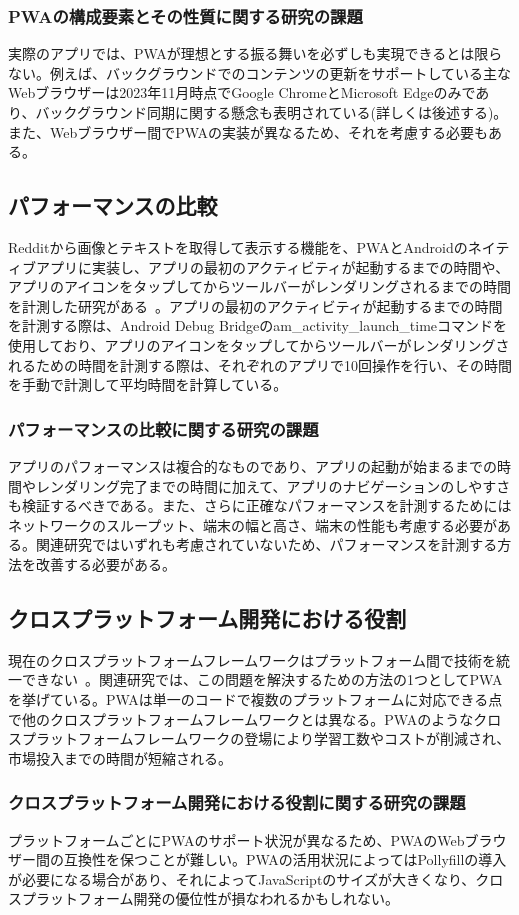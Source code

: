 \subsubsection{PWAの構成要素とその性質に関する研究の課題}
\label{subsubsection:PWAの構成要素とその性質に関する研究の課題}
実際のアプリでは、PWAが理想とする振る舞いを必ずしも実現できるとは限らない。例えば、バックグラウンドでのコンテンツの更新をサポートしている主なWebブラウザーは2023年11月時点でGoogle ChromeとMicrosoft Edgeのみであり、バックグラウンド同期に関する懸念も表明されている(詳しくは後述する)。また、Webブラウザー間でPWAの実装が異なるため、それを考慮する必要もある。
\subsection{パフォーマンスの比較}
\label{subsection:パフォーマンスの比較}
Redditから画像とテキストを取得して表示する機能を、PWAとAndroidのネイティブアプリに実装し、アプリの最初のアクティビティが起動するまでの時間や、アプリのアイコンをタップしてからツールバーがレンダリングされるまでの時間を計測した研究がある~\cite{Andreas2018ProgressiveWebApps}。アプリの最初のアクティビティが起動するまでの時間を計測する際は、Android Debug Bridgeのam\_activity\_launch\_timeコマンドを使用しており、アプリのアイコンをタップしてからツールバーがレンダリングされるための時間を計測する際は、それぞれのアプリで10回操作を行い、その時間を手動で計測して平均時間を計算している。
\subsubsection{パフォーマンスの比較に関する研究の課題}
\label{subsubsection:パフォーマンスの比較に関する研究の課題}
アプリのパフォーマンスは複合的なものであり、アプリの起動が始まるまでの時間やレンダリング完了までの時間に加えて、アプリのナビゲーションのしやすさも検証するべきである。また、さらに正確なパフォーマンスを計測するためにはネットワークのスループット、端末の幅と高さ、端末の性能も考慮する必要がある。関連研究ではいずれも考慮されていないため、パフォーマンスを計測する方法を改善する必要がある。
\subsection{クロスプラットフォーム開発における役割}
\label{subsection:クロスプラットフォーム開発における役割}
現在のクロスプラットフォームフレームワークはプラットフォーム間で技術を統一できない~\cite{Majchrzak2018ProgressiveWebApps}。関連研究では、この問題を解決するための方法の1つとしてPWAを挙げている。PWAは単一のコードで複数のプラットフォームに対応できる点で他のクロスプラットフォームフレームワークとは異なる。PWAのようなクロスプラットフォームフレームワークの登場により学習工数やコストが削減され、市場投入までの時間が短縮される。
\subsubsection{クロスプラットフォーム開発における役割に関する研究の課題}
\label{subsubsection:クロスプラットフォーム開発における役割に関する研究の課題}
プラットフォームごとにPWAのサポート状況が異なるため、PWAのWebブラウザー間の互換性を保つことが難しい。PWAの活用状況によってはPollyfillの導入が必要になる場合があり、それによってJavaScriptのサイズが大きくなり、クロスプラットフォーム開発の優位性が損なわれるかもしれない。